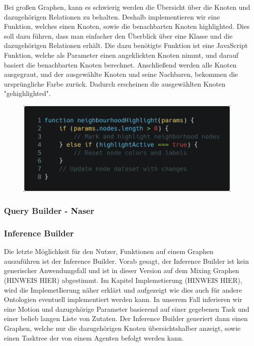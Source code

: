 Bei großen Graphen, kann es schwierig werden die Übersicht über die Knoten und dazugehörigen Relationen zu behalten. Deshalb implementieren wir eine Funktion, welches einen Knoten, sowie die benachbarten Knoten highlighted.
Dies soll dazu führen, dass man einfacher den Überblick über eine Klasse und die dazugehörigen Relationen erhält.
Die dazu benötigte Funktion ist eine JavaScript Funktion, welche als Parameter einen angeklickten Knoten nimmt, und darauf basiert die benachbarten Knoten berechnet. Anschließend werden alle Knoten
ausgegraut, und der ausgewählte Knoten und seine Nachbaren, bekommen die ursprüngliche Farbe zurück. Dadurch erscheinen die ausgewählten Knoten "gehighlighted".
\begin{figure}[!ht]
    \includegraphics[scale=0.3]{Graphics/neighbourhood_highlighting.png}
\end{figure}

\subsubsection*{Query Builder - Naser}

\subsubsection*{Inference Builder}
Die letzte Möglichkeit für den Nutzer, Funktionen auf einem Graphen auszuführen ist der Inference Builder.
Vorab gesagt, der Inference Builder ist kein generischer Anwendungsfall und ist in dieser Version auf dem Mixing Graphen (HINWEIS HIER) abgestimmt.
Im Kapitel Implemetierung (HINWEIS HIER), wird die ImplemetIierung näher erklärt und aufgezeigt wie dies auch für andere Ontologien eventuell implementiert werden kann.
In unserem Fall inferieren wir eine Motion und dazugehörige Parameter basierend auf einer gegebenen Task und einer belieb langen Liste von Zutaten.
Der Inference Builder generiert dann einen Graphen, welche nur die dazugehörigen Knoten übersichtshalber anzeigt, sowie einen Tasktree der von einem Agenten befolgt werden kann.

